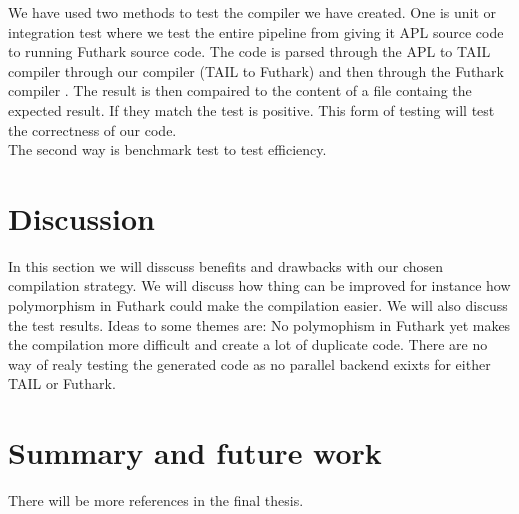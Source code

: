 \documentclass[11pt]{article}
\begin{document}
We have used two methods to test the compiler we have created.
One is unit or integration test where we test the entire pipeline from giving it APL source code to running Futhark source code.
The code is parsed through the APL to TAIL compiler \cite{ElsmanDybdal:Array:2014}
through our compiler (TAIL to Futhark) and then through the Futhark compiler \cite{TroelsHenriksen}.
The result is then compaired to the content of a file containg the expected result.
If they match the test is positive. This form of testing will test the correctness of our code. \\

The second way is benchmark test to test efficiency. 


\section{Discussion}
In this section we will disscuss benefits and drawbacks with our chosen compilation strategy.
We will discuss how thing can be improved for instance how polymorphism in Futhark could make the compilation easier.
We will also discuss the test results.
Ideas to some themes are: No polymophism in Futhark yet makes the compilation more difficult and create a lot of duplicate code.
There are no way of realy testing the generated code as no parallel backend exixts for either TAIL or Futhark.

\section{Summary and future work}




{}


There will be more references in the final thesis. 
\end{document}
